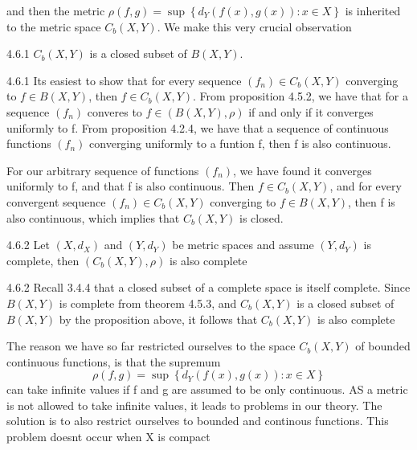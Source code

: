 \documentclass[a4paper,norsk]{article}
\begin{document}
and then the metric $ \rho \left( f, g \right) = \sup \left\{ d_Y \left( f(x), g(x)  \right) : x \in X  \right\}  $ is inherited to the metric space $ C_b \left( X, Y \right)  $. We make this very crucial observation


\begin{propositionbox}{4.6.1}{}
$ C_b \left( X, Y \right)  $ is a closed subset of $ B \left( X, Y \right)  $. 

\begin{proofbox}{4.6.1}{}
  Its easiest to show that for every sequence $ \left( f_n \right) \in C_b \left( X, Y \right)  $ converging to $ f \in B \left( X, Y \right)  $, then $ f \in C_b \left( X, Y \right)  $. From proposition 4.5.2, we have that for a sequence $ \left( f_n \right)  $ converes to $ f \in \left( B \left( X, Y \right) ,\rho \right)  $ if and only if it converges uniformly to f. From proposition 4.2.4, we have that a sequence of continuous functions $ \left( f_n \right)  $ converging uniformly to a funtion f, then f is also continuous. 
  
  For our arbitrary sequence of functions $ \left( f_n \right)  $, we have found it converges uniformly to f, and that f is also continuous. Then $ f \in C_b \left( X, Y \right)  $, and for every convergent sequence $ \left( f_n \right) \in C_b \left( X, Y \right)   $   converging to $ f \in B \left( X, Y \right)  $, then f is also continuous, which implies that $ C_b \left( X, Y \right)  $ is closed.   
\end{proofbox}
\end{propositionbox}

\begin{theorembox}{4.6.2}{}
Let $ \left( X, d_X \right)  $ and $ \left( Y, d_Y \right)  $ be metric spaces and assume $ \left( Y, d_Y \right)  $ is complete, then $ \left( C_b \left( X, Y \right) , \rho \right)  $ is also complete

\begin{proofbox}{4.6.2}{}
  Recall 3.4.4 that a closed subset of a complete space is itself complete. Since $ B \left( X, Y \right)  $ is complete from theorem 4.5.3, and $ C_b \left( X, Y \right)  $ is a closed subset of $ B \left( X, Y \right)  $  by the proposition above, it follows that $ C_b \left( X, Y \right)  $ is also complete 
\end{proofbox}
\end{theorembox}



The reason we have so far restricted ourselves to the space $ C_b \left( X, Y \right)  $ of bounded continuous functions, is that the supremum 
\[
    \rho \left( f, g \right) = \sup \left\{ d_Y \left( f(x), g(x)  \right) : x \in X  \right\} 
\]
can take infinite values if f and g are assumed to be only continuous. AS a metric is not allowed to take infinite values, it leads to problems in our theory. The solution is to also restrict ourselves to bounded and continous functions. This problem doesnt occur when X is compact
\end{document}

